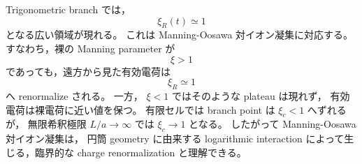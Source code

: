 \documentclass[11pt,a4paper]{ltjsarticle}
\theoremstyle{definition}
\theoremstyle{remark}
\begin{document}
Trigonometric branch では，
\begin{equation}
\xi_R(t)\simeq1
\end{equation}
となる広い領域が現れる。
これは Manning-Oosawa 対イオン凝集に対応する。
すなわち，裸の Manning parameter が
\begin{equation}
\xi>1
\end{equation}
であっても，遠方から見た有効電荷は
\begin{equation}
\xi_R\simeq1
\end{equation}
へ renormalize される。
一方，
\(\xi<1\)
ではそのような plateau は現れず，
有効電荷は裸電荷に近い値を保つ。
有限セルでは branch point は
\(\xi_c<1\)
へずれるが，
無限希釈極限
\(L/a\to\infty\)
では
\(\xi_c\to1\)
となる。
したがって Manning-Oosawa 対イオン凝集は，
円筒 geometry に由来する logarithmic interaction によって生じる，臨界的な charge renormalization と理解できる。

\printbibliography
\end{document}
